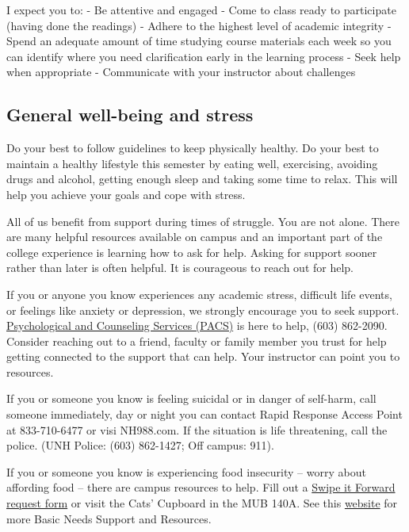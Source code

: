 \documentclass[
  letterpaper,
  DIV=11,
  numbers=noendperiod]{scrreprt}
\begin{document}
I expect you to: - Be attentive and engaged - Come to class ready to
participate (having done the readings) - Adhere to the highest level of
academic integrity - Spend an adequate amount of time studying course
materials each week so you can identify where you need clarification
early in the learning process - Seek help when appropriate - Communicate
with your instructor about challenges

\hypertarget{general-well-being-and-stress}{%
\subsection*{General well-being and
stress}\label{general-well-being-and-stress}}

Do your best to follow guidelines to keep physically healthy. Do your
best to maintain a healthy lifestyle this semester by eating well,
exercising, avoiding drugs and alcohol, getting enough sleep and taking
some time to relax. This will help you achieve your goals and cope with
stress.

All of us benefit from support during times of struggle. You are not
alone. There are many helpful resources available on campus and an
important part of the college experience is learning how to ask for
help. Asking for support sooner rather than later is often helpful. It
is courageous to reach out for help.

If you or anyone you know experiences any academic stress, difficult
life events, or feelings like anxiety or depression, we strongly
encourage you to seek support.
\href{https://www.unh.edu/pacs/}{Psychological and Counseling Services
(PACS)} is here to help, (603) 862-2090. Consider reaching out to a
friend, faculty or family member you trust for help getting connected to
the support that can help. Your instructor can point you to resources.

If you or someone you know is feeling suicidal or in danger of
self-harm, call someone immediately, day or night you can contact Rapid
Response Access Point at 833-710-6477 or visi NH988.com. If the
situation is life threatening, call the police. (UNH Police: (603)
862-1427; Off campus: 911).

If you or someone you know is experiencing food insecurity -- worry
about affording food -- there are campus resources to help. Fill out a
\href{https://cm.maxient.com/reportingform.php?UnivofNH\&layout_id=15}{Swipe
it Forward request form} or visit the Cats' Cupboard in the MUB 140A.
See this
\href{https://www.unh.edu/dean-of-students/getting-help/housing-food-financial-basic-needs-support}{website}
for more Basic Needs Support and Resources.
\end{document}
